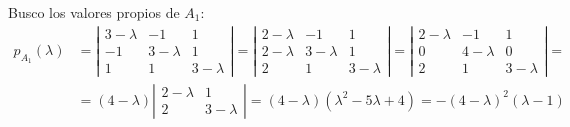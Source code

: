 \begin{ejercicio}
\begin{enumerate}
        Busco los valores propios de $A_1$:
        \begin{equation*}\begin{split}
            p_{A_1}(\lambda)&
            =\left|\begin{array}{ccc}
                3-\lambda & -1 & 1 \\
                -1 & 3-\lambda & 1 \\
                1 & 1 & 3-\lambda
            \end{array}\right|
            =\left|\begin{array}{ccc}
                2-\lambda & -1 & 1 \\
                2-\lambda & 3-\lambda & 1 \\
                2 & 1 & 3-\lambda
            \end{array}\right|
            =\left|\begin{array}{ccc}
                2-\lambda & -1 & 1 \\
                0 & 4-\lambda & 0 \\
                2 & 1 & 3-\lambda
            \end{array}\right| =\\
            & =(4-\lambda) \left|\begin{array}{cc}
                2-\lambda & 1 \\
                2 & 3-\lambda
            \end{array}\right|
            = (4-\lambda)(\lambda^2-5\lambda+4)
            = -(4-\lambda)^2(\lambda-1)
        \end{split}\end{equation*}


\end{enumerate}
\end{ejercicio}
